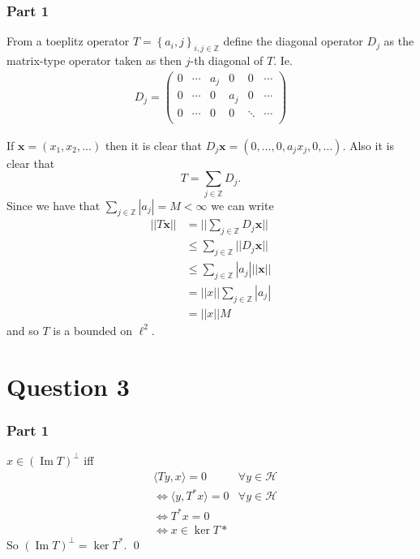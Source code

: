 \documentclass{unswmaths}
\begin{document}
\subsubsection*{Part 1}
From a toeplitz operator $ T = \left\{ a{_i,j} \right\}_{i,j\in\mathbb{Z}} $
define the diagonal operator $ D_j $ as the matrix-type operator taken as then
$ j$-th diagonal of $ T $. Ie.
\begin{align*}
D_j = 
\left(
\begin{matrix}
	0 & \cdots & a_j & 0 & 0 & \cdots \\
	0 & \cdots & 0 & a_j & 0 & \cdots  \\
	0 & \cdots & 0 & 0 & \ddots & \cdots  \\
\end{matrix}
\right)
\end{align*}

If $ \mathbf{x} = (x_1, x_2, \ldots ) $ then it is clear that $ D_j \mathbf{x} = ( 0, \ldots, 0, a_j x_j, 0, \ldots ) $.
Also it is clear that 
$$
	T = \sum_{j \in \mathbb{Z}} D_j.
$$
Since we have that $ \sum_{j \in\mathbb{Z}} |a_j|  = M < \infty $ we can write
\begin{align*}
	||T\mathbf{x}|| &= || \sum_{j \in \mathbb{Z}} D_j \mathbf{x} || \\
		&\leq \sum_{j\in\mathbb{Z}} ||D_j \mathbf{x} || \\
		&\leq \sum_{j \in\mathbb{Z}} |a_j| ||\mathbf{x} || \\
		&= ||x|| \sum_{j \in\mathbb{Z}} |a_j| \\
		&= ||x|| M
\end{align*}
and so $ T $ is a bounded on $ \ell^2 $.
\newpage
\section*{Question 3}
\subsubsection*{Part 1}
$ x \in (\operatorname{Im} T)^\perp $ iff
\begin{align*}
    & \langle Ty, x \rangle = 0 &\forall y \in \mathcal{H}\\
    & \Leftrightarrow \langle y, T^* x \rangle = 0 & \forall y \in \mathcal{H} \\
    & \Leftrightarrow T^* x = 0 \\
    & \Leftrightarrow x \in \ker T*
\end{align*}
So $ (\operatorname{Im} T)^\perp = \ker T^* $. \qed
\end{document}
